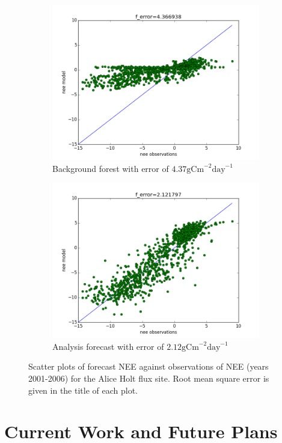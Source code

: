 \documentclass[11pt]{article}
\begin{document}
\begin{figure}[!h]
\centering
\begin{subfigure}{.5\textwidth}
  \centering
  \includegraphics[width=.7\linewidth]{scatterobsvsmodfb.png}
  \caption{Background forest with error of $4.37 \text{gCm}^{-2}\text{day}^{-1}$}
  \label{fig:sub1}
\end{subfigure}%
\begin{subfigure}{.5\textwidth}
  \centering
  \includegraphics[width=.7\linewidth]{scatterobsvsmodfa.png}
  \caption{Analysis forecast with error of $2.12 \text{gCm}^{-2}\text{day}^{-1}$}
  \label{fig:sub2}
\end{subfigure}
\caption{Scatter plots of forecast NEE against observations of NEE (years 2001-2006) for the Alice Holt flux site. Root mean square error is given in the title of each plot.}
\label{fig:neeobs}
\end{figure}

\section{Current Work and Future Plans}
\end{document}
